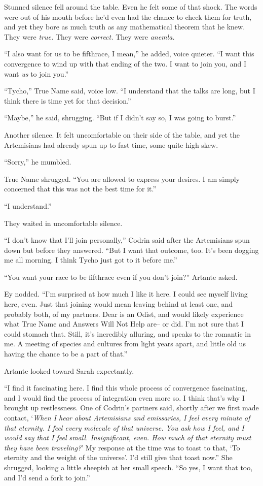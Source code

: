 Stunned silence fell around the table. Even he felt some of that shock. The words were out of his mouth before he'd even had the chance to check them for truth, and yet they bore as much truth as any mathematical theorem that he knew. They were \emph{true.} They were \emph{correct.} They were \emph{anemla.}

``I also want for us to be fifthrace, I mean,'' he added, voice quieter. ``I want this convergence to wind up with that ending of the two. I want to join you, and I want \emph{us} to join you.''

``Tycho,'' True Name said, voice low. ``I understand that the talks are long, but I think there is time yet for that decision.''

``Maybe,'' he said, shrugging. ``But if I didn't say so, I was going to burst.''

Another silence. It felt uncomfortable on their side of the table, and yet the Artemisians had already spun up to fast time, some quite high skew.

``Sorry,'' he mumbled.

True Name shrugged. ``You are allowed to express your desires. I am simply concerned that this was not the best time for it.''

``I understand.''

They waited in uncomfortable silence.

``I don't know that I'll join personally,'' Codrin said after the Artemisians spun down but before they answered. ``But I want that outcome, too. It's been dogging me all morning. I think Tycho just got to it before me.''

``You want your race to be fifthrace even if you don't join?'' Artante asked.

Ey nodded. ``I'm surprised at how much I like it here. I could see myself living here, even. Just that joining would mean leaving behind at least one, and probably both, of my partners. Dear is an Odist, and would likely experience what True Name and Answers Will Not Help are-- or did. I'm not sure that I could stomach that. Still, it's incredibly alluring, and speaks to the romantic in me. A meeting of species and cultures from light years apart, and little old us having the chance to be a part of that.''

Artante looked toward Sarah expectantly.

``I find it fascinating here. I find this whole process of convergence fascinating, and I would find the process of integration even more so. I think that's why I brought up restlessness. One of Codrin's partners said, shortly after we first made contact, `\emph{When I hear about Artemisians and emissaries, I feel every minute of that eternity. I feel every molecule of that universe. You ask how I feel, and I would say that I feel small. Insignificant, even. How much of that eternity must they have been traveling?}' My response at the time was to toast to that, `To eternity and the weight of the universe'. I'd still give that toast now.'' She shrugged, looking a little sheepish at her small speech. ``So yes, I want that too, and I'd send a fork to join.''

